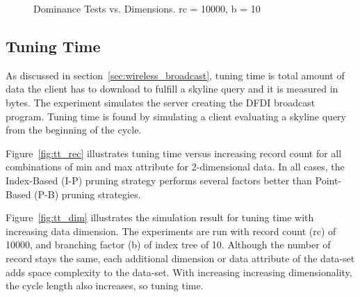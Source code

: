 \begin{figure}
  \centering
  \caption{\small Dominance Tests vs. Dimensions. rc = 10000, b = 10}
  \label{fig:dt_dim}
\end{figure}


\subsection{Tuning Time}\label{sec:exp_tuning_time}

As discussed in section~\ref{sec:wireless_broadcast}, tuning time is total
amount of data the client has to download to fulfill a skyline query and
it is measured in bytes. The experiment simulates the server creating the
DFDI broadcast program. Tuning time is found by simulating a client evaluating
a skyline query from the beginning of the cycle.

Figure~\ref{fig:tt_rec} illustrates tuning time versus increasing record count
for all combinations of min and max attribute for 2-dimensional data. In
all cases, the Index-Based (I-P) pruning strategy performs several factors
better than Point-Based (P-B) pruning strategies.

Figure~\ref{fig:tt_dim} illustrates the simulation result for tuning time with
increasing data dimension. The experiments are run with record count (rc) of
10000, and branching factor (b) of index tree of 10.
Although the number of record stays the same, each additional dimension or
data attribute of the data-set adds space complexity to the data-set. With
increasing increasing dimensionality, the cycle length also increases, so
tuning time.

